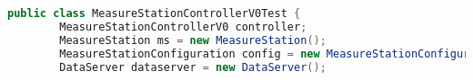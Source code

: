 \documentclass{article}
\begin{document}
\begin{lstlisting}[language=java]
public class MeasureStationControllerV0Test {   
        MeasureStationControllerV0 controller;  
        MeasureStation ms = new MeasureStation();   
        MeasureStationConfiguration config = new MeasureStationConfiguration();     
        DataServer dataserver = new DataServer();
\end{lstlisting}
\end{document}
